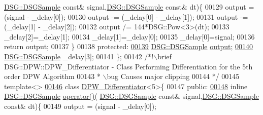 \begin{DoxyCode}
      \hyperlink{namespace_d_s_g_ac39a94cd27ebcd9c1e7502d0c624894a}{DSG::DSGSample} \textcolor{keyword}{const}& signal,\hyperlink{namespace_d_s_g_ac39a94cd27ebcd9c1e7502d0c624894a}{DSG::DSGSample} \textcolor{keyword}{const}& dt)\{
00129                 output  = (signal - \_delay[0]);
00130                 output -= (\_delay[0] - \_delay[1]);
00131                 output -= (\_delay[1] - \_delay[2]);
00132                 output /= 144*DSG::Pow<3>(dt);
00133                 \_delay[2]=\_delay[1];
00134                 \_delay[1]=\_delay[0];
00135                 \_delay[0]=signal;
00136                 \textcolor{keywordflow}{return} output;
00137             \}
00138         \textcolor{keyword}{protected}:
\hypertarget{_d_p_w_8h_source_l00139}{}\hyperlink{class_d_s_g_1_1_d_p_w_1_1_d_p_w___differentiator_3_014_01_4_a5fd7e2dc19c470cacb8e23942c1afdbb}{00139}             \hyperlink{namespace_d_s_g_ac39a94cd27ebcd9c1e7502d0c624894a}{DSG::DSGSample} \hyperlink{class_d_s_g_1_1_d_p_w_1_1_d_p_w___differentiator_3_014_01_4_a5fd7e2dc19c470cacb8e23942c1afdbb}{output};
\hypertarget{_d_p_w_8h_source_l00140}{}\hyperlink{class_d_s_g_1_1_d_p_w_1_1_d_p_w___differentiator_3_014_01_4_aacd153f49201708823a05aad2506ede9}{00140}             \hyperlink{namespace_d_s_g_ac39a94cd27ebcd9c1e7502d0c624894a}{DSG::DSGSample} \_delay[3];
00141         \};\textcolor{comment}{}
00142 \textcolor{comment}{        /*!\(\backslash\)brief DSG::DPW::DPW\_Differentiator - Class Performing Differentiation for the 5th order DPW
       Algorithm}
00143 \textcolor{comment}{         * \(\backslash\)bug Causes major clipping}
00144 \textcolor{comment}{         */}
00145         \textcolor{keyword}{template}<>
\hypertarget{_d_p_w_8h_source_l00146}{}\hyperlink{class_d_s_g_1_1_d_p_w_1_1_d_p_w___differentiator_3_015_01_4}{00146}         \textcolor{keyword}{class }\hyperlink{class_d_s_g_1_1_d_p_w_1_1_d_p_w___differentiator}{DPW\_Differentiator}<5>\{
00147         \textcolor{keyword}{public}:
\hypertarget{_d_p_w_8h_source_l00148}{}\hyperlink{class_d_s_g_1_1_d_p_w_1_1_d_p_w___differentiator_3_015_01_4_a58aa0475d87f841e656f725f7206fe1c}{00148}             \textcolor{keyword}{inline} \hyperlink{namespace_d_s_g_ac39a94cd27ebcd9c1e7502d0c624894a}{DSG::DSGSample} \hyperlink{class_d_s_g_1_1_d_p_w_1_1_d_p_w___differentiator_3_015_01_4_a58aa0475d87f841e656f725f7206fe1c}{operator()}(
      \hyperlink{namespace_d_s_g_ac39a94cd27ebcd9c1e7502d0c624894a}{DSG::DSGSample} \textcolor{keyword}{const}& signal,\hyperlink{namespace_d_s_g_ac39a94cd27ebcd9c1e7502d0c624894a}{DSG::DSGSample} \textcolor{keyword}{const}& dt)\{
00149                 output  = (signal - \_delay[0]);

\end{DoxyCode}
